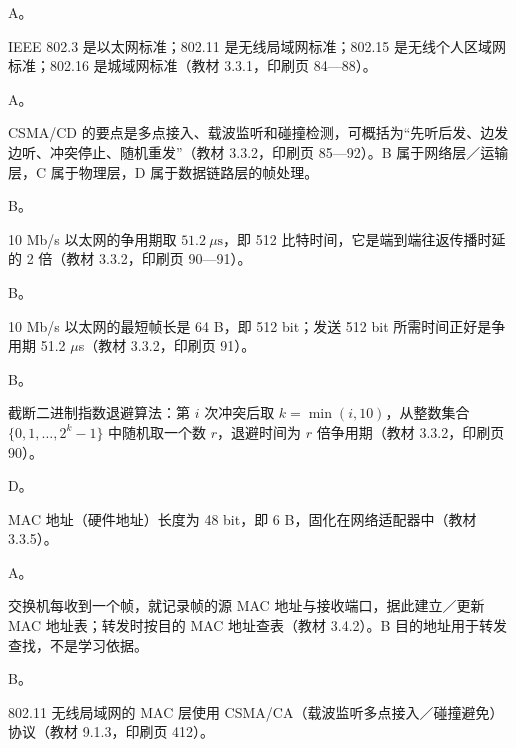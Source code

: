 \documentclass[a4paper,11pt]{article}
\begin{document}


\q A。\begin{analysis}IEEE 802.3 是以太网标准；802.11 是无线局域网标准；802.15 是无线个人区域网标准；802.16 是城域网标准（教材 3.3.1，印刷页 84—88）。\end{analysis}

\q A。\begin{analysis}CSMA/CD 的要点是多点接入、载波监听和碰撞检测，可概括为“先听后发、边发边听、冲突停止、随机重发”（教材 3.3.2，印刷页 85—92）。B 属于网络层／运输层，C 属于物理层，D 属于数据链路层的帧处理。\end{analysis}

\q B。\begin{analysis}10 Mb/s 以太网的争用期取 $51.2\ \mu\text{s}$，即 512 比特时间，它是端到端往返传播时延的 2 倍（教材 3.3.2，印刷页 90—91）。\end{analysis}

\q B。\begin{analysis}10 Mb/s 以太网的最短帧长是 64 B，即 512 bit；发送 512 bit 所需时间正好是争用期 51.2 $\mu$s（教材 3.3.2，印刷页 91）。\end{analysis}

\q B。\begin{analysis}截断二进制指数退避算法：第 $i$ 次冲突后取 $k=\min(i,10)$，从整数集合 $\{0,1,\dots,2^k-1\}$ 中随机取一个数 $r$，退避时间为 $r$ 倍争用期（教材 3.3.2，印刷页 90）。\end{analysis}

\q D。\begin{analysis}MAC 地址（硬件地址）长度为 48 bit，即 6 B，固化在网络适配器中（教材 3.3.5）。\end{analysis}

\q A。\begin{analysis}交换机每收到一个帧，就记录帧的源 MAC 地址与接收端口，据此建立／更新 MAC 地址表；转发时按目的 MAC 地址查表（教材 3.4.2）。B 目的地址用于转发查找，不是学习依据。\end{analysis}

\q B。\begin{analysis}802.11 无线局域网的 MAC 层使用 CSMA/CA（载波监听多点接入／碰撞避免）协议（教材 9.1.3，印刷页 412）。\end{analysis}
\end{document}

